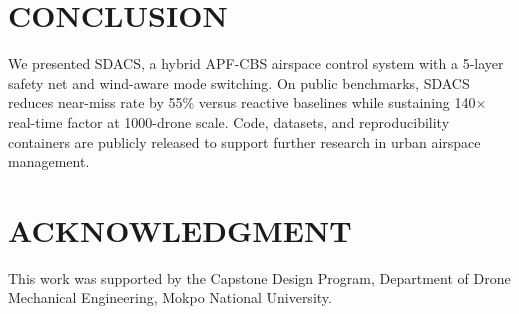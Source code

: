 \section{CONCLUSION}

We presented SDACS, a hybrid APF-CBS airspace control system with a
5-layer safety net and wind-aware mode switching. On public
benchmarks, SDACS reduces near-miss rate by 55\% versus reactive
baselines while sustaining 140$\times$ real-time factor at 1000-drone
scale. Code, datasets, and reproducibility containers are publicly
released to support further research in urban airspace management.

\section*{ACKNOWLEDGMENT}

This work was supported by the Capstone Design Program, Department of
Drone Mechanical Engineering, Mokpo National University.
